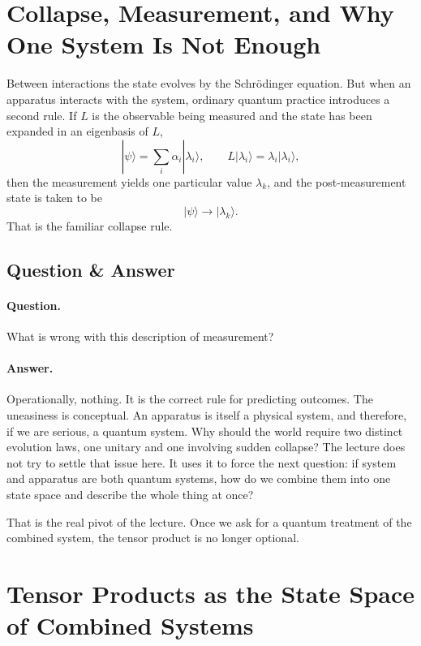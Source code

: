 \section{Collapse, Measurement, and Why One System Is Not Enough}

Between interactions the state evolves by the Schr\"odinger equation. But when an apparatus interacts with the system, ordinary quantum practice introduces a second rule. If \(L\) is the observable being measured and the state has been expanded in an eigenbasis of \(L\),
\begin{equation}
|\psi\rangle=\sum_i \alpha_i |\lambda_i\rangle,
\qquad
L|\lambda_i\rangle=\lambda_i|\lambda_i\rangle,
\end{equation}
then the measurement yields one particular value \(\lambda_k\), and the post-measurement state is taken to be
\begin{equation}
|\psi\rangle \longrightarrow |\lambda_k\rangle.
\end{equation}
That is the familiar collapse rule.

\subsection{Question \& Answer}

\paragraph{Question.} What is wrong with this description of measurement?

\paragraph{Answer.} Operationally, nothing. It is the correct rule for predicting outcomes. The uneasiness is conceptual. An apparatus is itself a physical system, and therefore, if we are serious, a quantum system. Why should the world require two distinct evolution laws, one unitary and one involving sudden collapse? The lecture does not try to settle that issue here. It uses it to force the next question: if system and apparatus are both quantum systems, how do we combine them into one state space and describe the whole thing at once?

That is the real pivot of the lecture. Once we ask for a quantum treatment of the combined system, the tensor product is no longer optional.

\section{Tensor Products as the State Space of Combined Systems}

